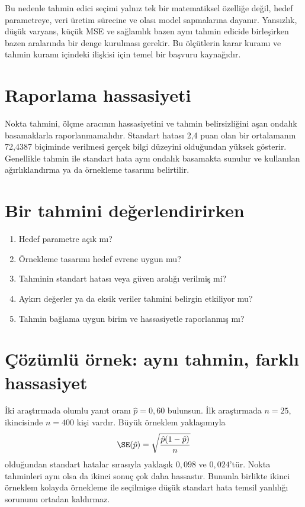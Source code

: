 Bu nedenle tahmin edici seçimi yalnız tek bir matematiksel özelliğe değil,
hedef parametreye, veri üretim sürecine ve olası model sapmalarına dayanır.
Yansızlık, düşük varyans, küçük MSE ve sağlamlık bazen aynı tahmin edicide
birleşirken bazen aralarında bir denge kurulması gerekir.
Bu ölçütlerin karar kuramı ve tahmin kuramı içindeki ilişkisi için
\citet{hogg2015} temel bir başvuru kaynağıdır.

\section{Raporlama hassasiyeti}

Nokta tahmini, ölçme aracının hassasiyetini ve tahmin belirsizliğini aşan
ondalık basamaklarla raporlanmamalıdır. Standart hatası 2,4 puan olan bir
ortalamanın 72,4387 biçiminde verilmesi gerçek bilgi düzeyini olduğundan
yüksek gösterir. Genellikle tahmin ile standart hata aynı ondalık basamakta
sunulur ve kullanılan ağırlıklandırma ya da örnekleme tasarımı belirtilir.

\section{Bir tahmini değerlendirirken}

\begin{enumerate}
  \item Hedef parametre açık mı?
  \item Örnekleme tasarımı hedef evrene uygun mu?
  \item Tahminin standart hatası veya güven aralığı verilmiş mi?
  \item Aykırı değerler ya da eksik veriler tahmini belirgin etkiliyor mu?
  \item Tahmin bağlama uygun birim ve hassasiyetle raporlanmış mı?
\end{enumerate}

\section{Çözümlü örnek: aynı tahmin, farklı hassasiyet}

İki araştırmada olumlu yanıt oranı $\hat p=0{,}60$ bulunsun. İlk araştırmada
$n=25$, ikincisinde $n=400$ kişi vardır. Büyük örneklem yaklaşımıyla
\[
\SE(\hat p)=\sqrt{\frac{\hat p(1-\hat p)}{n}}
\]
olduğundan standart hatalar sırasıyla yaklaşık $0{,}098$ ve $0{,}024$'tür.
Nokta tahminleri aynı olsa da ikinci sonuç çok daha hassastır. Bununla
birlikte ikinci örneklem kolayda örnekleme ile seçilmişse düşük standart hata
temsil yanlılığı sorununu ortadan kaldırmaz.

